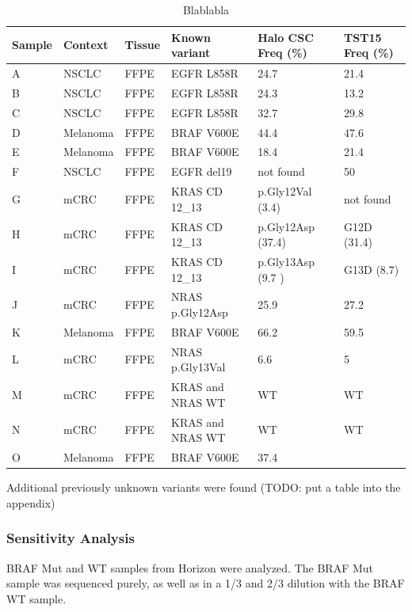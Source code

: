 \begin{table}[!htbp]
  \caption[failed_halo]{Blablabla}
  \centering
    \begin{tabular}{| p{1.2cm} | p{1.7cm} | p{1cm} | p{3.5cm} | p{3cm} | p{2.5cm} |}
      \hline
      Sample & Context & Tissue & Known variant & Halo CSC Freq (\%) & TST15 Freq (\%) \\ \hline \hline
      A & NSCLC & FFPE & EGFR L858R & 24.7 & 21.4 \\
      B & NSCLC & FFPE & EGFR L858R & 24.3 & 13.2 \\
      C & NSCLC & FFPE & EGFR L858R & 32.7 & 29.8\\
      D & Melanoma & FFPE & BRAF V600E & 44.4 & 47.6 \\
      E & Melanoma & FFPE & BRAF V600E & 18.4 & 21.4 \\
      F & NSCLC & FFPE & EGFR del19 & not found & 50 \\
      G & mCRC & FFPE & KRAS CD 12\_13 & p.Gly12Val (3.4) & not found \\
      H & mCRC & FFPE & KRAS CD 12\_13  & p.Gly12Asp (37.4) & G12D (31.4)\\
      I & mCRC & FFPE & KRAS CD 12\_13  & p.Gly13Asp (9.7 )& G13D (8.7) \\
      J & mCRC & FFPE & NRAS p.Gly12Asp & 25.9 & 27.2 \\
      K & Melanoma & FFPE & BRAF V600E & 66.2 & 59.5 \\
      L & mCRC & FFPE & NRAS p.Gly13Val & 6.6 & 5 \\
      M & mCRC & FFPE & KRAS and NRAS WT & WT & WT \\
      N & mCRC & FFPE & KRAS and NRAS WT & WT & WT \\
      O & Melanoma & FFPE &BRAF V600E & 37.4 & \\
      \hline
    \end{tabular}
\end{table}

Additional previously unknown variants were found (TODO: put a table into the appendix)

\subsubsection{Sensitivity Analysis}
BRAF Mut and WT samples from Horizon were analyzed. The BRAF Mut sample was
sequenced purely, as well as in a 1/3 and 2/3 dilution with the BRAF WT sample.

